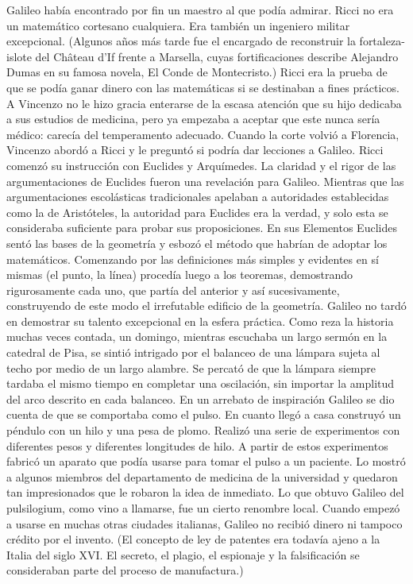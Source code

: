 \documentclass[letterpaper, 10pt, journal]{IEEEtran}
\begin{document}
\newline
Galileo había encontrado por fin un maestro al que podía admirar. Ricci no era un matemático cortesano cualquiera. Era también un ingeniero militar excepcional. (Algunos años más tarde fue el encargado de reconstruir la fortaleza-islote del Château d’If frente a Marsella, cuyas fortificaciones describe Alejandro Dumas en su famosa novela, El Conde de Montecristo.) Ricci era la prueba de que se podía ganar dinero con las matemáticas si se destinaban a fines prácticos. \cite{[2]}
\newline
A Vincenzo no le hizo gracia enterarse de la escasa atención que su hijo dedicaba a sus estudios de medicina, pero ya empezaba a aceptar que este nunca sería médico: carecía del temperamento adecuado. Cuando la corte volvió a Florencia, Vincenzo abordó a Ricci y le preguntó si podría dar lecciones a Galileo. Ricci comenzó su instrucción con Euclides y Arquímedes. La claridad y el rigor de las argumentaciones de Euclides fueron una revelación para Galileo. Mientras que las argumentaciones escolásticas tradicionales apelaban a autoridades establecidas como la de Aristóteles, la autoridad para Euclides era la verdad, y solo esta se consideraba suficiente para probar sus proposiciones. En sus Elementos Euclides sentó las bases de la geometría y esbozó el método que habrían de adoptar los matemáticos. Comenzando por las definiciones más simples y evidentes en sí mismas (el punto, la línea) procedía luego a los teoremas, demostrando rigurosamente cada uno, que partía del anterior y así sucesivamente, construyendo de este modo el irrefutable edificio de la geometría.\cite{[1]}
\newline
Galileo no tardó en demostrar su talento excepcional en la esfera práctica. Como reza la historia muchas veces contada, un domingo, mientras escuchaba un largo sermón en la catedral de Pisa, se sintió intrigado por el balanceo de una lámpara sujeta al techo por medio de un largo alambre. Se percató de que la lámpara siempre tardaba el mismo tiempo en completar una oscilación, sin importar la amplitud del arco descrito en cada balanceo. En un arrebato de inspiración Galileo se dio cuenta de que se comportaba como el pulso. En cuanto llegó a casa construyó un péndulo con un hilo y una pesa de plomo. Realizó una serie de experimentos con diferentes pesos y diferentes longitudes de hilo. A partir de estos experimentos fabricó un aparato que podía usarse para tomar el pulso a un paciente. Lo mostró a algunos miembros del departamento de medicina de la universidad y quedaron tan impresionados que le robaron la idea de inmediato. Lo que obtuvo Galileo del pulsilogium, como vino a llamarse, fue un cierto renombre local. Cuando empezó a usarse en muchas otras ciudades italianas, Galileo no recibió dinero ni tampoco crédito por el invento. (El concepto de ley de patentes era todavía ajeno a la Italia del siglo XVI. El secreto, el plagio, el espionaje y la falsificación se consideraban parte del proceso de manufactura.)\cite{[2]}
\end{document}

